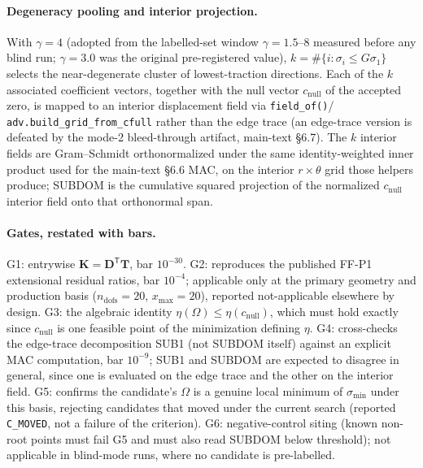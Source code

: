 \documentclass[11pt]{article}
\begin{document}
\paragraph{Degeneracy pooling and interior projection.} With $\gamma=4$
(adopted from the labelled-set window $\gamma=1.5$--$8$ measured before any
blind run; $\gamma=3.0$ was the original pre-registered value),
$k=\#\{i:\sigma_i\le G\sigma_1\}$ selects the
near-degenerate cluster of lowest-traction directions. Each of the $k$
associated coefficient vectors, together with the null vector
$c_{\mathrm{null}}$ of the accepted zero, is mapped to an interior
displacement field via \texttt{field\_of()}/
\texttt{adv.build\_grid\_from\_cfull} rather than the edge trace (an
edge-trace version is defeated by the mode-2 bleed-through artifact,
main-text \S6.7). The $k$ interior fields are Gram--Schmidt
orthonormalized under the same identity-weighted inner product used for
the main-text \S6.6 MAC, on the interior $r\times\theta$ grid those
helpers produce; SUBDOM is the cumulative squared projection of the
normalized $c_{\mathrm{null}}$ interior field onto that orthonormal span.

\paragraph{Gates, restated with bars.} G1: entrywise
$\mathbf{K}=\mathbf{D}^{\mathsf T}\mathbf{T}$, bar $10^{-30}$. G2: reproduces the published FF-P1 extensional residual
ratios, bar $10^{-4}$; applicable only at the primary geometry and
production basis ($n_{\mathrm{dofs}}=20$, $x_{\max}=20$), reported
not-applicable elsewhere by design. G3: the algebraic identity
$\eta(\Omega)\le\eta(c_{\mathrm{null}})$, which must hold exactly since
$c_{\mathrm{null}}$ is one feasible point of the minimization defining
$\eta$. G4: cross-checks the edge-trace decomposition SUB1 (not SUBDOM
itself) against an explicit MAC computation, bar $10^{-9}$; SUB1 and
SUBDOM are expected to disagree in general, since one is evaluated on the
edge trace and the other on the interior field. G5: confirms the
candidate's $\Omega$ is a genuine local minimum of $\sigma_{\min}$
under this basis, rejecting candidates that moved under the current
search (reported \texttt{C\_MOVED}, not a failure of the criterion). G6:
negative-control siting (known non-root points must fail G5 and must
also read SUBDOM below threshold); not applicable in blind-mode runs,
where no candidate is pre-labelled.
\end{document}

